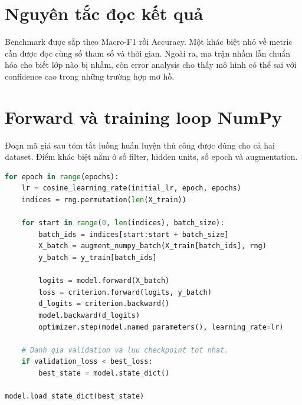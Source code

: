 \documentclass[12pt,a4paper]{report}
\begin{document}
\begin{table}[H]
\centering
\caption{Kiến trúc và chính sách huấn luyện của framework}
\label{tab:framework_config}
\end{table}

\section{Nguyên tắc đọc kết quả}
Benchmark được sắp theo Macro-F1 rồi Accuracy.
Một khác biệt nhỏ về metric cần được đọc cùng số tham số và thời gian.
Ngoài ra, ma trận nhầm lẫn chuẩn hóa cho biết lớp nào bị nhầm, còn error analysis cho thấy mô hình có thể sai với confidence cao trong những trường hợp mơ hồ.

\newpage
\section{Forward và training loop NumPy}
Đoạn mã giả sau tóm tắt luồng huấn luyện thủ công được dùng cho cả hai dataset.
Điểm khác biệt nằm ở số filter, hidden units, số epoch và augmentation.

\begin{lstlisting}[language=Python,caption={Training loop khái quát của CNN thuần NumPy},label={lst:numpy_training}]
for epoch in range(epochs):
    lr = cosine_learning_rate(initial_lr, epoch, epochs)
    indices = rng.permutation(len(X_train))

    for start in range(0, len(indices), batch_size):
        batch_ids = indices[start:start + batch_size]
        X_batch = augment_numpy_batch(X_train[batch_ids], rng)
        y_batch = y_train[batch_ids]

        logits = model.forward(X_batch)
        loss = criterion.forward(logits, y_batch)
        d_logits = criterion.backward()
        model.backward(d_logits)
        optimizer.step(model.named_parameters(), learning_rate=lr)

    # Danh gia validation va luu checkpoint tot nhat.
    if validation_loss < best_loss:
        best_state = model.state_dict()

model.load_state_dict(best_state)
\end{lstlisting}
\end{document}
